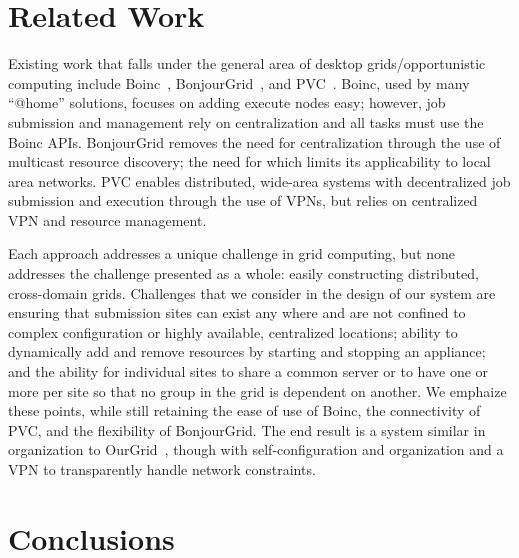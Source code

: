 \documentclass[conference]{IEEEtran}
\begin{document}
\section{Related Work}
\label{related_work}

Existing work that falls under the general area of desktop grids/opportunistic
computing include Boinc~\cite{boinc}, BonjourGrid~\cite{bonjourgrid}, and
PVC~\cite{pvc}.  Boinc, used by many ``@home'' solutions, focuses on adding
execute nodes easy; however, job submission and management rely on
centralization and all tasks must use the Boinc APIs.  BonjourGrid removes the
need for centralization through the use of multicast resource discovery; the
need for which limits its applicability to local area networks.  PVC enables
distributed, wide-area systems with decentralized job submission and execution
through the use of VPNs, but relies on centralized VPN and resource management.

Each approach addresses a unique challenge in grid computing, but none
addresses the challenge presented as a whole: easily constructing distributed,
cross-domain grids.  Challenges that we consider in the design of our system
are ensuring that submission sites can exist any where and are not confined to
complex configuration or highly available, centralized locations; ability to
dynamically add and remove resources by starting and stopping an appliance; and
the ability for individual sites to share a common server or to have one or
more per site so that no group in the grid is dependent on another.  We
emphaize these points, while still retaining the ease of use of Boinc, the
connectivity of PVC, and the flexibility of BonjourGrid.  The end result is a
system similar in organization to OurGrid~\cite{ourgrid}, though with
self-configuration and organization and a VPN to transparently handle network
constraints.

\section{Conclusions}
\label{conclusions}
\end{document}
